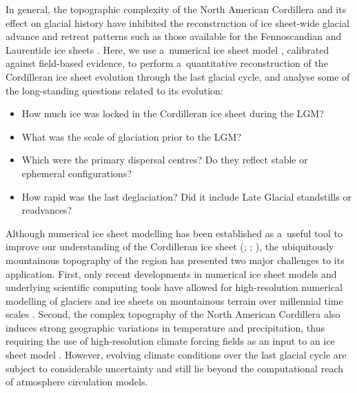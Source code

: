 \documentclass[tc, manuscript]{copernicus}
\begin{document}
      In general, the topographic complexity of the North American
      Cordillera and its effect on glacial history have inhibited the
      reconstruction of ice sheet-wide glacial advance and retreat patterns
      such as those available for the Fennoscandian and Laurentide ice
      sheets \citep{Boulton.etal.2001, Dyke.Prest.1987, Dyke.etal.2003,
      Kleman.etal.1997, Kleman.etal.2010, Stroeven.etal.inreview}. Here, we
      use a~numerical ice sheet model \citep{PISM-authors.2015}, calibrated
      against field-based evidence, to perform a~quantitative reconstruction
      of the Cordilleran ice sheet evolution through the last glacial cycle,
      and analyse some of the long-standing questions related to its
      evolution:
\begin{itemize}
  \item How much ice was locked in the Cordilleran ice sheet during the LGM?
  \item What was the scale of glaciation prior to the LGM?
  \item Which were the primary dispersal centres? Do they reflect stable or
    ephemeral configurations?
  \item How rapid was the last deglaciation? Did it include Late Glacial
    standstills or readvances?
\end{itemize}
      Although numerical ice sheet modelling has been established as
      a~useful tool to improve our understanding of the Cordilleran ice
      sheet (\citealp[p.~227]{Jackson.Clague.1991}; \citealp{Robert.1991};
      \citealp{Marshall.etal.2000}), the ubiquitously mountainous topography
      of the region has presented two major challenges to its application.
      First, only recent developments in numerical ice sheet models and
      underlying scientific computing tools \citep{Bueler.Brown.2009,
      Balay.etal.2015} have allowed for high-resolution numerical modelling
      of glaciers and ice sheets on mountainous terrain over millennial time
      scales \citep[e.g.,][]{Golledge.etal.2012}. Second, the complex
      topography of the North American Cordillera also induces strong
      geographic variations in temperature and precipitation, thus requiring
      the use of high-resolution climate forcing fields as an input to an
      ice sheet model \citep{Seguinot.etal.2014}. However, evolving climate
      conditions over the last glacial cycle are subject to considerable
      uncertainty and still lie beyond the computational reach of atmosphere
      circulation models.
\end{document}
